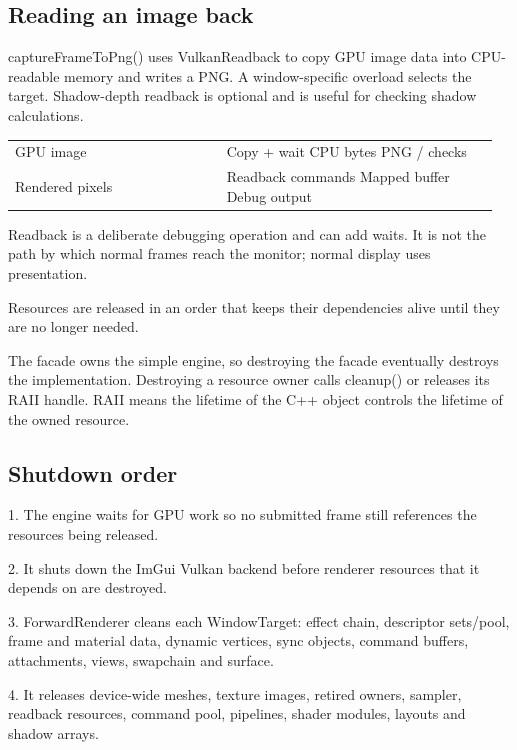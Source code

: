 \documentclass[11pt,a4paper]{article}
\begin{document}
\subsection*{Reading an image back}
captureFrameToPng() uses VulkanReadback to copy GPU image data into CPU-readable memory and writes a PNG. A window-specific overload selects the target. Shadow-depth readback is optional and is useful for checking shadow calculations.

{\small
\begin{longtable}{@{}p{0.42\linewidth}p{0.54\linewidth}@{}}
GPU image & Copy + wait        CPU bytes                  PNG / checks \\
Rendered pixels & Readback commands     Mapped buffer               Debug output \\
\end{longtable}
}

Readback is a deliberate debugging operation and can add waits. It is not the path by which normal frames reach the monitor; normal display uses presentation.

\label{core-45}
Resources are released in an order that keeps their dependencies alive until they are no longer needed.

The facade owns the simple engine, so destroying the facade eventually destroys the implementation. Destroying a resource owner calls cleanup() or releases its RAII handle. RAII means the lifetime of the C++ object controls the lifetime of the owned resource.

\subsection*{Shutdown order}
1. The engine waits for GPU work so no submitted frame still references the resources being released.

2. It shuts down the ImGui Vulkan backend before renderer resources that it depends on are destroyed.

3. ForwardRenderer cleans each WindowTarget: effect chain, descriptor sets/pool, frame and material data, dynamic vertices, sync objects, command buffers, attachments, views, swapchain and surface.

4. It releases device-wide meshes, texture images, retired owners, sampler, readback resources, command pool, pipelines, shader modules, layouts and shadow arrays.
\end{document}
